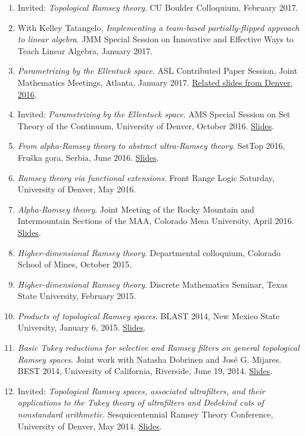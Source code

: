 \documentclass[10pt,letterpaper]{article}
\begin{document}
\begin{enumerate}
\item Invited: \emph{Topological Ramsey theory}. CU Boulder Colloquium, February 2017.
\item With Kelley Tatangelo, \emph{Implementing a team-based partially-flipped approach to linear algebra}. JMM Special Session on Innovative and Effective Ways to Teach Linear Algebra, January 2017.
\item \emph{Parametrizing by the Ellentuck space}. ASL Contributed Paper Session, Joint Mathematics Meetings, Atlanta, January 2017. \href{https://trujillo1234.github.io/research/presentations/ams-western-ellentuck.pdf}{Related slides from Denver, 2016}.
\item Invited: \emph{Parametrizing by the Ellentuck space}. AMS Special Session on Set Theory of the Continuum, University of Denver, October 2016. \href{https://trujillo1234.github.io/research/presentations/ams-western-ellentuck.pdf}{Slides}.
\item \emph{From alpha-Ramsey theory to abstract ultra-Ramsey theory}. SetTop 2016, Fruška gora, Serbia, June 2016. \href{https://trujillo1234.github.io/research/presentations/settop-alpha-ramsey.pdf}{Slides}.
\item \emph{Ramsey theory via functional extensions}. Front Range Logic Saturday, University of Denver, May 2016.
\item \emph{Alpha-Ramsey theory}. Joint Meeting of the Rocky Mountain and Intermountain Sections of the MAA, Colorado Mesa University, April 2016. \href{https://trujillo1234.github.io/research/presentations/maa-mesa-alpha-ramsey.pdf}{Slides}.
\item \emph{Higher-dimensional Ramsey theory}. Departmental colloquium, Colorado School of Mines, October 2015.
\item \emph{Higher-dimensional Ramsey theory}. Discrete Mathematics Seminar, Texas State University, February 2015.
\item \emph{Products of topological Ramsey spaces}. BLAST 2014, New Mexico State University, January 6, 2015. \href{https://trujillo1234.github.io/research/presentations/blast-2015-products.pdf}{Slides}.
\item \emph{Basic Tukey reductions for selective and Ramsey filters on general topological Ramsey spaces}. Joint work with Natasha Dobrinen and José G. Mijares. BEST 2014, University of California, Riverside, June 19, 2014. \href{https://trujillo1234.github.io/research/presentations/best-2014-tukey-reductions.pdf}{Slides}.
\item Invited: \emph{Topological Ramsey spaces, associated ultrafilters, and their applications to the Tukey theory of ultrafilters and Dedekind cuts of nonstandard arithmetic}. Sesquicentennial Ramsey Theory Conference, University of Denver, May 2014. \href{https://trujillo1234.github.io/research/presentations/sesquicentennial-ramsey.pdf}{Slides}.

\end{enumerate}
\end{document}
